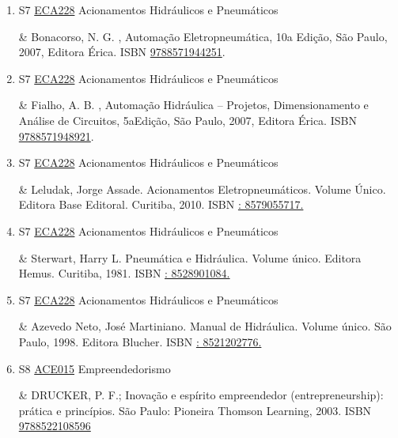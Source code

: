 \documentclass[12pt,a4paper]{book}
\begin{document}
\begin{enumerate}
 

 \item S7 \hyperref[PUD:ECA228]{ECA228} Acionamentos Hidráulicos e Pneumáticos

&  Bonacorso, N.  G. , Automação Eletropneumática, 10a Edição, São Paulo, 2007, Editora Érica.  ISBN \href{http://www.bn.br/site/pages/servicosProfissionais/agenciaISBN/isbnBusca/FbnBuscaISBNCatalogo.asp?pField=ISBN&pIntPagina=1&pISBN=71944251&nidbISBN=true&hidbISBN=true}{9788571944251}. 

 

 \item S7 \hyperref[PUD:ECA228]{ECA228} Acionamentos Hidráulicos e Pneumáticos

&  Fialho, A.  B. , Automação Hidráulica – Projetos, Dimensionamento e Análise de Circuitos, 5aEdição, São Paulo, 2007, Editora Érica.  ISBN \href{http://www.bn.br/site/pages/servicosProfissionais/agenciaISBN/isbnBusca/FbnBuscaISBNCatalogo.asp?pField=ISBN&pIntPagina=1&pISBN=71948921&nidbISBN=true&hidbISBN=true}{9788571948921}.
 \item S7 \hyperref[PUD:ECA228]{ECA228} Acionamentos Hidráulicos e Pneumáticos

&  Leludak, Jorge Assade.  Acionamentos Eletropneumáticos.  Volume Único.  Editora Base Editoral.  Curitiba, 2010.  ISBN \href{http://www.google.com/search?hl=pt-BR&tbo=p&tbm=bks&q=isbn:: 8579055717.&num=10}{: 8579055717.} 

 

 \item S7 \hyperref[PUD:ECA228]{ECA228} Acionamentos Hidráulicos e Pneumáticos

&  Sterwart, Harry L.  Pneumática e Hidráulica.  Volume único.  Editora Hemus.  Curitiba, 1981.  ISBN \href{http://www.google.com/search?hl=pt-BR&tbo=p&tbm=bks&q=isbn:: 8528901084.&num=10}{: 8528901084.} 

 

 \item S7 \hyperref[PUD:ECA228]{ECA228} Acionamentos Hidráulicos e Pneumáticos

&  Azevedo Neto, José Martiniano.  Manual de Hidráulica.  Volume único.  São Paulo, 1998.  Editora Blucher.  ISBN \href{http://www.google.com/search?hl=pt-BR&tbo=p&tbm=bks&q=isbn:: 8521202776.&num=10}{: 8521202776.}
 \item S8 \hyperref[PUD:ACE015]{ACE015} Empreendedorismo

&   DRUCKER, P.  F.;  Inovação e espírito empreendedor (entrepreneurship): prática e princípios.  São Paulo: Pioneira Thomson Learning, 2003.  ISBN \href{http://www.bn.br/site/pages/servicosProfissionais/agenciaISBN/isbnBusca/FbnBuscaISBNCatalogo.asp?pField=ISBN&pIntPagina=1&pISBN=22108596&nidbISBN=true&hidbISBN=true}{9788522108596}
 


\end{enumerate}
\end{document}
